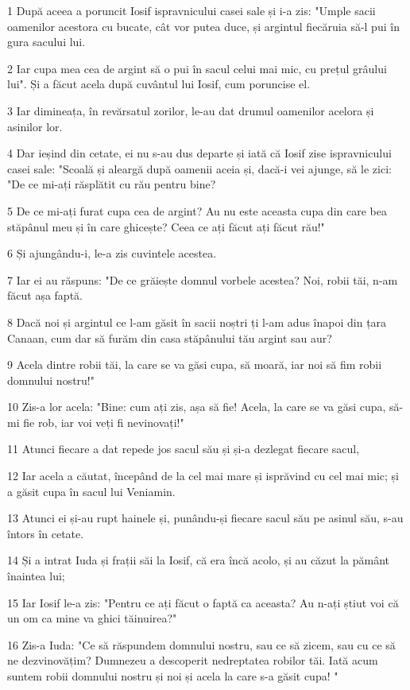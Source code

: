 \par 1 După aceea a poruncit Iosif ispravnicului casei sale și i-a zis: "Umple sacii oamenilor acestora cu bucate, cât vor putea duce, și argintul fiecăruia să-l pui în gura sacului lui.
\par 2 Iar cupa mea cea de argint să o pui în sacul celui mai mic, cu prețul grâului lui". Și a făcut acela după cuvântul lui Iosif, cum poruncise el.
\par 3 Iar dimineața, în revărsatul zorilor, le-au dat drumul oamenilor acelora și asinilor lor.
\par 4 Dar ieșind din cetate, ei nu s-au dus departe și iată că Iosif zise ispravnicului casei sale: "Scoală și aleargă după oamenii aceia și, dacă-i vei ajunge, să le zici: "De ce mi-ați răsplătit cu rău pentru bine?
\par 5 De ce mi-ați furat cupa cea de argint? Au nu este aceasta cupa din care bea stăpânul meu și în care ghicește? Ceea ce ați făcut ați făcut rău!"
\par 6 Și ajungându-i, le-a zis cuvintele acestea.
\par 7 Iar ei au răspuns: "De ce grăiește domnul vorbele acestea? Noi, robii tăi, n-am făcut așa faptă.
\par 8 Dacă noi și argintul ce l-am găsit în sacii noștri ți l-am adus înapoi din țara Canaan, cum dar să furăm din casa stăpânului tău argint sau aur?
\par 9 Acela dintre robii tăi, la care se va găsi cupa, să moară, iar noi să fim robii domnului nostru!"
\par 10 Zis-a lor acela: "Bine: cum ați zis, așa să fie! Acela, la care se va găsi cupa, să-mi fie rob, iar voi veți fi nevinovați!"
\par 11 Atunci fiecare a dat repede jos sacul său și și-a dezlegat fiecare sacul,
\par 12 Iar acela a căutat, începând de la cel mai mare și isprăvind cu cel mai mic; și a găsit cupa în sacul lui Veniamin.
\par 13 Atunci ei și-au rupt hainele și, punându-și fiecare sacul său pe asinul său, s-au întors în cetate.
\par 14 Și a intrat Iuda și frații săi la Iosif, că era încă acolo, și au căzut la pământ înaintea lui;
\par 15 Iar Iosif le-a zis: "Pentru ce ați făcut o faptă ca aceasta? Au n-ați știut voi că un om ca mine va ghici tăinuirea?"
\par 16 Zis-a Iuda: "Ce să răspundem domnului nostru, sau ce să zicem, sau cu ce să ne dezvinovățim? Dumnezeu a descoperit nedreptatea robilor tăi. Iată acum suntem robii domnului nostru și noi și acela la care s-a găsit cupa! "
